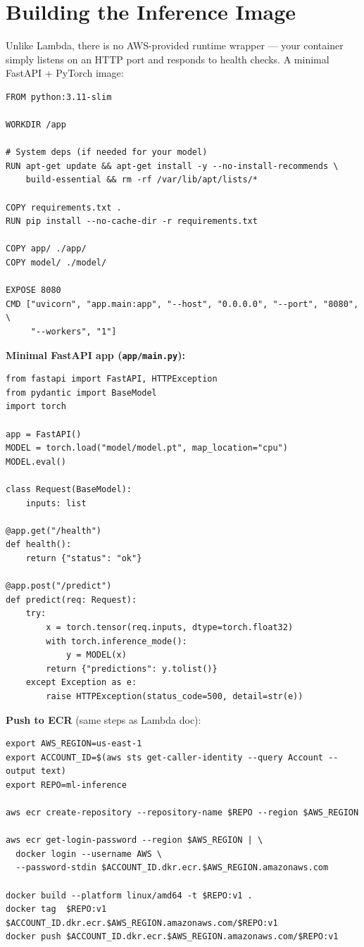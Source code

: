 \documentclass[11pt,a4paper]{article}
\begin{document}
\section{Building the Inference Image}
\label{sec:image}

Unlike Lambda, there is no AWS-provided runtime wrapper --- your container
simply listens on an HTTP port and responds to health checks. A minimal
FastAPI + PyTorch image:

\begin{lstlisting}[style=dockercode]
FROM python:3.11-slim

WORKDIR /app

# System deps (if needed for your model)
RUN apt-get update && apt-get install -y --no-install-recommends \
    build-essential && rm -rf /var/lib/apt/lists/*

COPY requirements.txt .
RUN pip install --no-cache-dir -r requirements.txt

COPY app/ ./app/
COPY model/ ./model/

EXPOSE 8080
CMD ["uvicorn", "app.main:app", "--host", "0.0.0.0", "--port", "8080", \
     "--workers", "1"]
\end{lstlisting}

\textbf{Minimal FastAPI app (\texttt{app/main.py}):}

\begin{lstlisting}[style=pycode]
from fastapi import FastAPI, HTTPException
from pydantic import BaseModel
import torch

app = FastAPI()
MODEL = torch.load("model/model.pt", map_location="cpu")
MODEL.eval()

class Request(BaseModel):
    inputs: list

@app.get("/health")
def health():
    return {"status": "ok"}

@app.post("/predict")
def predict(req: Request):
    try:
        x = torch.tensor(req.inputs, dtype=torch.float32)
        with torch.inference_mode():
            y = MODEL(x)
        return {"predictions": y.tolist()}
    except Exception as e:
        raise HTTPException(status_code=500, detail=str(e))
\end{lstlisting}

\textbf{Push to ECR} (same steps as Lambda doc):

\begin{lstlisting}[style=bashcode]
export AWS_REGION=us-east-1
export ACCOUNT_ID=$(aws sts get-caller-identity --query Account --output text)
export REPO=ml-inference

aws ecr create-repository --repository-name $REPO --region $AWS_REGION

aws ecr get-login-password --region $AWS_REGION | \
  docker login --username AWS \
  --password-stdin $ACCOUNT_ID.dkr.ecr.$AWS_REGION.amazonaws.com

docker build --platform linux/amd64 -t $REPO:v1 .
docker tag  $REPO:v1  $ACCOUNT_ID.dkr.ecr.$AWS_REGION.amazonaws.com/$REPO:v1
docker push $ACCOUNT_ID.dkr.ecr.$AWS_REGION.amazonaws.com/$REPO:v1
\end{lstlisting}
\end{document}
